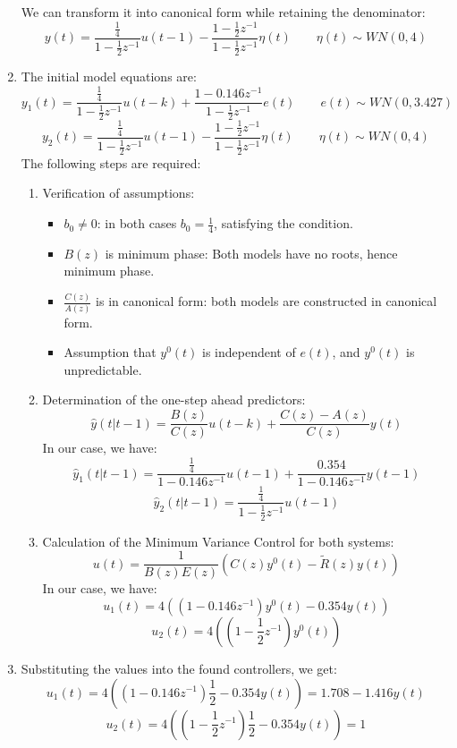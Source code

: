 \begin{enumerate}
        We can transform it into canonical form while retaining the denominator:
        \[y(t)=\dfrac{\frac{1}{4}}{1-\frac{1}{2}z^{-1}}u(t-1)-\dfrac{1-\frac{1}{2}z^{-1}}{1-\frac{1}{2}z^{-1}}\eta(t) \qquad \eta(t)\sim WN(0,4)\]
    \item The initial model equations are:
        \[y_1(t)=\dfrac{\frac{1}{4}}{1-\frac{1}{2}z^{-1}}u(t-k)+\dfrac{1-0.146z^{-1}}{1-\frac{1}{2}z^{-1}}e(t) \qquad e(t)\sim WN(0,3.427)\]
        \[y_2(t)=\dfrac{\frac{1}{4}}{1-\frac{1}{2}z^{-1}}u(t-1)-\dfrac{1-\frac{1}{2}z^{-1}}{1-\frac{1}{2}z^{-1}}\eta(t) \qquad \eta(t)\sim WN(0,4)\]
        The following steps are required:
        \begin{enumerate}
            \item Verification of assumptions:
                \begin{itemize}
                    \item $b_0\neq 0$: in both cases $b_0=\frac{1}{4}$, satisfying the condition.
                    \item $B(z)$  is minimum phase: Both models have no roots, hence minimum phase.
                    \item $\frac{C(z)}{A(z)}$  is in canonical form: both models are constructed in canonical form.
                    \item Assumption that $y^0(t)$ is independent of $e(t)$, and $y^0(t)$ is unpredictable. 
                \end{itemize}
            \item Determination of the one-step ahead predictors:
                \[\hat{y}(t|t-1)=\dfrac{B(z)}{C(z)}u(t-k)+\dfrac{C(z)-A(z)}{C(z)}y(t)\]
                In our case, we have:
                \[\hat{y}_1(t|t-1)=\dfrac{\frac{1}{4}}{1-0.146z^{-1}}u(t-1)+\dfrac{0.354}{1-0.146z^{-1}}y(t-1)\]
                \[\hat{y}_2(t|t-1)=\dfrac{\frac{1}{4}}{1-\frac{1}{2}z^{-1}}u(t-1)\]
            \item Calculation of the Minimum Variance Control for both systems:
                \[u(t)=\dfrac{1}{B(z)E(z)}\left(C(z)y^0(t)-\tilde{R}(z)y(t)\right)\]
                In our case, we have: 
                \[u_1(t)=4\left(\left(1-0.146z^{-1}\right)y^0(t)-0.354y(t)\right)\]
                \[u_2(t)=4\left(\left(1-\frac{1}{2}z^{-1}\right)y^0(t)\right)\]
        \end{enumerate}
    \item Substituting the values into the found controllers, we get:
        \[u_1(t)=4\left(\left(1-0.146z^{-1}\right)\dfrac{1}{2}-0.354y(t)\right)=1.708-1.416y(t)\]
        \[u_2(t)=4\left(\left(1-\frac{1}{2}z^{-1}\right)\dfrac{1}{2}-0.354y(t)\right)=1\]
\end{enumerate}